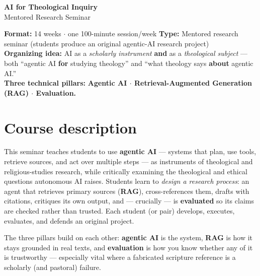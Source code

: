 \documentclass[11pt]{article}
\begin{document}
\begin{center}
  {\color{primary}\Huge\bfseries AI for Theological Inquiry}\\[0.3em]
  {\color{accent}\Large Mentored Research Seminar}\\[0.9em]
  \begin{tcolorbox}[colback=light,colframe=rule,boxrule=0.5pt,arc=2pt,
    left=8pt,right=8pt,top=6pt,bottom=6pt,width=0.95\textwidth]
    \small
    \textbf{Format:} 14 weeks $\cdot$ one 100-minute session/week \quad
    \textbf{Type:} Mentored research seminar (students produce an original agentic-AI research project)\\[0.3em]
    \textbf{Organizing idea:} AI as a \emph{scholarly instrument} \textbf{and} as a \emph{theological subject} ---
    both ``agentic AI \textbf{for} studying theology'' and ``what theology says \textbf{about} agentic AI.''\\[0.3em]
    \textbf{Three technical pillars:} \textbf{Agentic AI $\cdot$ Retrieval-Augmented Generation (RAG) $\cdot$ Evaluation.}
  \end{tcolorbox}
\end{center}

\section{Course description}
This seminar teaches students to use \textbf{agentic AI} --- systems that plan, use tools, retrieve
sources, and act over multiple steps --- as instruments of theological and religious-studies
research, while critically examining the theological and ethical questions autonomous AI raises.
Students learn to \emph{design a research process}: an agent that retrieves primary sources
(\textbf{RAG}), cross-references them, drafts with citations, critiques its own output, and --- crucially ---
is \textbf{evaluated} so its claims are checked rather than trusted. Each student (or pair) develops,
executes, evaluates, and defends an original project.

The three pillars build on each other: \textbf{agentic AI} is the system, \textbf{RAG} is how it stays
grounded in real texts, and \textbf{evaluation} is how you know whether any of it is trustworthy ---
especially vital where a fabricated scripture reference is a scholarly (and pastoral) failure.

\end{document}
